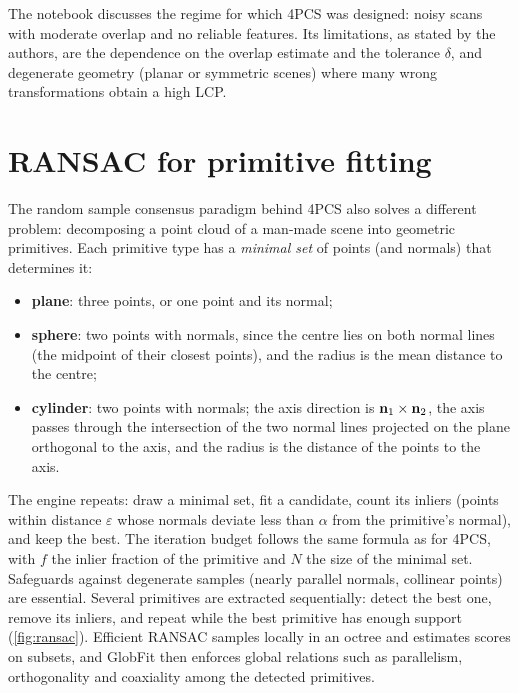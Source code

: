 
The notebook discusses the regime for which 4PCS was designed: noisy scans with moderate overlap
and no reliable features. Its limitations, as stated by the authors, are the dependence on the
overlap estimate and the tolerance $\delta$, and degenerate geometry (planar or symmetric scenes)
where many wrong transformations obtain a high LCP.

\section{RANSAC for primitive fitting}

The random sample consensus paradigm \citep{Fischler1981} behind 4PCS also solves a different
problem: decomposing a point cloud of a man-made scene into geometric primitives. Each primitive
type has a \emph{minimal set} of points (and normals) that determines it:
\begin{itemize}
  \item \textbf{plane}: three points, or one point and its normal;
  \item \textbf{sphere}: two points with normals, since the centre lies on both normal lines (the
  midpoint of their closest points), and the radius is the mean distance to the centre;
  \item \textbf{cylinder}: two points with normals; the axis direction is
  $\mathbf{n}_1\times\mathbf{n}_2$, the axis passes through the intersection of the two normal lines projected on
  the plane orthogonal to the axis, and the radius is the distance of the points to the axis.
\end{itemize}
The engine repeats: draw a minimal set, fit a candidate, count its inliers (points within
distance $\varepsilon$ whose normals deviate less than $\alpha$ from the primitive's normal), and
keep the best. The iteration budget follows the same formula as for 4PCS, with $f$ the inlier
fraction of the primitive and $N$ the size of the minimal set. Safeguards against degenerate
samples (nearly parallel normals, collinear points) are essential. Several primitives are
extracted sequentially: detect the best one, remove its inliers, and repeat while the best
primitive has enough support (\cref{fig:ransac}). Efficient RANSAC \citep{Schnabel2007} samples
locally in an octree and estimates scores on subsets, and GlobFit \citep{Li2011} then enforces
global relations such as parallelism, orthogonality and coaxiality among the detected primitives.

